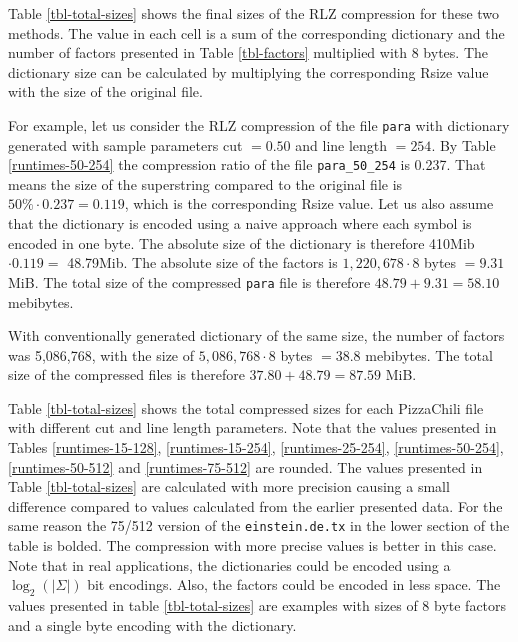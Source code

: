\documentclass[english,twoside,censored,csm,algorithms-track-2020]{HYthesisML}
\theoremstyle{plain}
\theoremstyle{definition}
\begin{document}
\vspace{-1cm}
Table \ref{tbl-total-sizes} shows
the final sizes of the RLZ compression for these two methods. The value in each cell is a sum of
the corresponding dictionary and the number of factors presented in Table \ref{tbl-factors} multiplied
with 8 bytes. The dictionary size can be calculated by multiplying the corresponding Rsize value with
the size of the original file.

For example, let us consider the RLZ compression of the file \texttt{para} with dictionary
generated with sample
parameters cut $= 0.50$ and line length $= 254$.
By Table \ref{runtimes-50-254} the compression ratio of the
file \texttt{para\_50\_254} is 0.237. That means the size of the superstring compared to the
original file is $50\% \cdot 0.237 = 0.119$, which is the corresponding Rsize value.
Let us also assume that the dictionary is encoded using a naive approach where each symbol is
encoded in one byte.
The absolute
size of the dictionary is therefore 410Mib $\cdot 0.119 = $ 48.79Mib. The absolute size of the
factors is $1,220,678\cdot 8$ bytes $= 9.31$ MiB. The total size of the compressed \texttt{para}
file is therefore $48.79 + 9.31 = 58.10$ mebibytes.

With conventionally generated dictionary of the same size, the number of factors was 5,086,768,
with the size of $5,086,768\cdot 8$ bytes $= 38.8$ mebibytes. The total size of the compressed
files is therefore $37.80 + 48.79 = 87.59$ MiB.

Table \ref{tbl-total-sizes} shows the total compressed sizes for each PizzaChili file with different
cut and line length parameters. Note that the values presented in Tables \ref{runtimes-15-128},
\ref{runtimes-15-254}, \ref{runtimes-25-254}, \ref{runtimes-50-254}, \ref{runtimes-50-512} and
\ref{runtimes-75-512} are rounded. The values presented in Table \ref{tbl-total-sizes} are
calculated with more precision causing a small difference compared to values calculated from the
earlier presented data. For the same reason the 75/512 version of the \texttt{einstein.de.tx}
in the lower section of the table is bolded. The compression with more precise values is better
in this case. Note that in real applications, the dictionaries could be encoded using a
$\log_2(|\Sigma|)$ bit encodings. Also, the factors could be encoded in less space. The values
presented in table \ref{tbl-total-sizes} are examples with sizes of 8 byte factors and a single
byte encoding with the dictionary.
\end{document}
